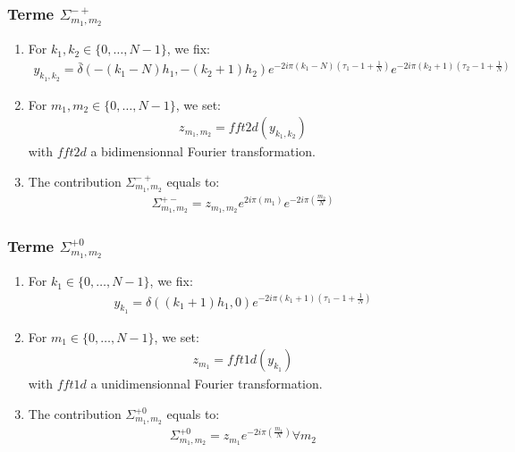 \subsubsection{Terme $\Sigma_{m_1,m_2}^{-+}$}

\begin{enumerate}
\item For $k_1,k_2\in\{0,\hdots,N-1\}$, we fix:
\begin{align*}
y_{k_1,k_2}= \bar{\delta}(-(k_1-N)h_1,-(k_2+1)h_2)e^{-2i\pi (k_1-N)\left(\tau_1-1+\frac{1}{N}\right)}e^{-2i\pi (k_2+1)\left(\tau_2-1+\frac{1}{N}\right)}
\end{align*}
\item For $m_1,m_2\in\{0,\hdots,N-1\}$, we set:
\begin{align*}
  z_{m_1,m_2}=fft2d(y_{k_1,k_2})
\end{align*}
with $fft2d$ a bidimensionnal Fourier transformation.
\item The contribution $\Sigma_{m_1,m_2}^{-+}$ equals to:
\begin{align*}
  \Sigma_{m_1,m_2}^{+-}=z_{m_1,m_2}e^{2i\pi\left(m_1\right)}e^{-2i\pi\left(\frac{m_2}{N}\right)}
\end{align*}
\end{enumerate}


\subsubsection{Terme $\Sigma_{m_1,m_2}^{+0}$}
\begin{enumerate}
\item For $k_1\in\{0,\hdots,N-1\}$, we fix:
\begin{align*}
y_{k_1}= \delta((k_1+1)h_1,0)e^{-2i\pi (k_1+1)\left(\tau_1-1+\frac{1}{N}\right)}
\end{align*}
\item For $m_1\in\{0,\hdots,N-1\}$, we set:
\begin{align*}
  z_{m_1}=fft1d(y_{k_1})
\end{align*}
with $fft1d$ a unidimensionnal Fourier transformation.
\item The contribution $\Sigma_{m_1,m_2}^{+0}$ equals to:
\begin{align*}
  \Sigma_{m_1,m_2}^{+0}=z_{m_1}e^{-2i\pi\left(\frac{m_1}{N}\right)} \forall m_2
\end{align*}
\end{enumerate}

